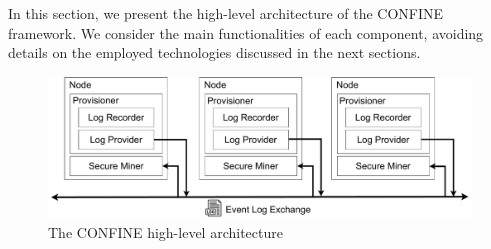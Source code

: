 
In this section, we present the high-level architecture of the CONFINE framework. We consider the main functionalities of each component, avoiding details on the employed technologies discussed in the next sections. %
\begin{figure}[t]
	\centering
	\includegraphics[width=1\linewidth]{content/figures/architecturediagram.pdf}
	\caption{The CONFINE high-level architecture}
	\label{fig:architecture_diagram}
\end{figure}

